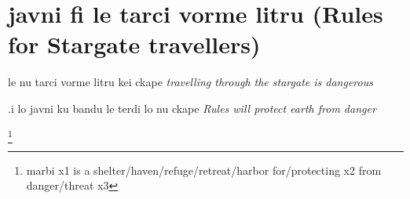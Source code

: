 \documentclass{article}
\newcommand{\para}[2]{#1 \emph{#2}}
\newcommand{\usefulWord}[2]{\footnote{#1 #2}}
\begin{document}
\section{javni fi le tarci vorme litru (Rules for Stargate travellers)}

\para{le nu tarci vorme litru kei ckape}{travelling through the stargate is dangerous}

\para{.i lo javni ku bandu le terdi lo nu ckape}{Rules will protect earth from danger}


\usefulWord{marbi}{x1 is a shelter/haven/refuge/retreat/harbor for/protecting x2 from danger/threat x3}
\end{document}
